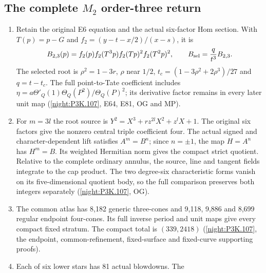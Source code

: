 \subsection{The complete $M_2$ order-three return}
\RungOne
\begin{enumerate}[label=\arabic*.]
\item Retain the original E6 equation and the actual six-factor
  Hom section. With $T(p)=p-G$ and
  $f_2=(y-t-x/2)/(x-s)$, it is
  \[
  B_{2,3}(p)=f_2(p)f_2(T^3p)f_2(Tp)^2f_2(T^2p)^2,
  \qquad B_{\rm sel}=\frac{q}{t^3}B_{2,3}.
  \]
  The selected root is
  $\rho^2=1-3r$, $\rho$ near $1/2$,
  $t_c=(1-3\rho^2+2\rho^3)/27$ and $q=t-t_c$.
  The full point-to-Tate coefficient includes
  $\eta=a\Theta'_Q(1)\Theta_Q(P^2)/\Theta_Q(P)^2$;
  its derivative factor remains in every later unit map
  (\cref{night:P3K.107}, E64, E81, OG and MP).
\item For $m=3l$ the root source is
  $Y^2=X^3+r z^{2l}X^2+z^lX+1$.
  The original six factors give the nonzero central triple
  coefficient four. The actual signed and character-dependent
  lift satisfies $A^m=B^n$; since $n=\pm1$, the map $H=A^n$
  has $H^m=B$. Its weighted Hermitian norm gives the compact
  strict quotient. Relative to the complete ordinary annulus,
  the source, line and tangent fields integrate to the cap
  product. The two degree-six characteristic forms vanish on
  its five-dimensional quotient body, so the full comparison
  preserves both integers separately
  (\cref{night:P3K.107}, OG).
\item The common atlas has 8,182 generic three-cones and
  9,118, 9,886 and 8,699 regular endpoint four-cones. Its full
  inverse period and unit maps give every compact fixed
  stratum. The compact total is $(339,2418)$
  (\cref{night:P3K.107}, the endpoint, common-refinement,
  fixed-surface and fixed-curve supporting proofs).
\item Each of six lower stars has 81 actual blowdowns. The

\end{enumerate}

